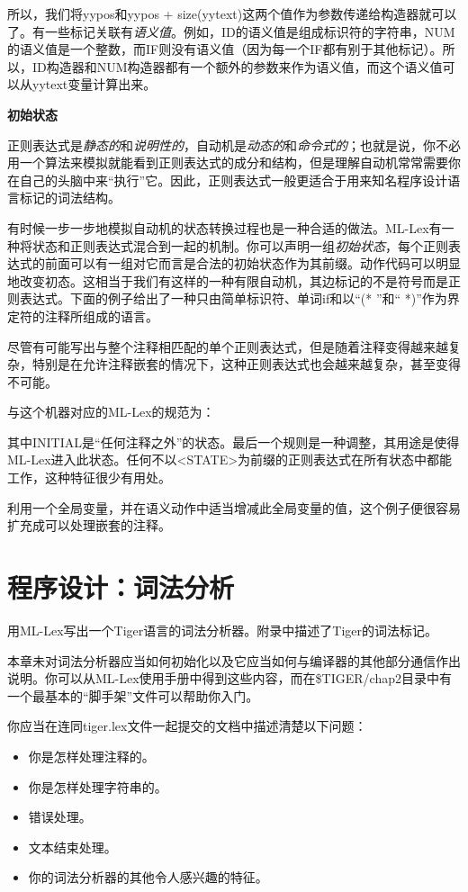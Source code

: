 \documentclass[cn,11pt,chinese]{elegantbook}
\begin{document}
所以，我们将yypos和yypos + size(yytext)这两个值作为参数传递给构造器就可以了。有一些标记关联有\textit{语义值}。例如，ID的语义值是组成标识符的字符串，NUM的语义值是一个整数，而IF则没有语义值（因为每一个IF都有别于其他标记）。所以，ID构造器和NUM构造器都有一个额外的参数来作为语义值，而这个语义值可以从yytext变量计算出来。

\textbf{初始状态}

正则表达式是\textit{静态的}和\textit{说明性的}，自动机是\textit{动态的}和\textit{命令式的}；也就是说，你不必用一个算法来模拟就能看到正则表达式的成分和结构，但是理解自动机常常需要你在自己的头脑中来“执行”它。因此，正则表达式一般更适合于用来知名程序设计语言标记的词法结构。

有时候一步一步地模拟自动机的状态转换过程也是一种合适的做法。ML-Lex有一种将状态和正则表达式混合到一起的机制。你可以声明一组\textit{初始状态}，每个正则表达式的前面可以有一组对它而言是合法的初始状态作为其前缀。动作代码可以明显地改变初态。这相当于我们有这样的一种有限自动机，其边标记的不是符号而是正则表达式。下面的例子给出了一种只由简单标识符、单词if和以“(* ”和“ *)”作为界定符的注释所组成的语言。

尽管有可能写出与整个注释相匹配的单个正则表达式，但是随着注释变得越来越复杂，特别是在允许注释嵌套的情况下，这种正则表达式也会越来越复杂，甚至变得不可能。

与这个机器对应的ML-Lex的规范为：

其中INITIAL是“任何注释之外”的状态。最后一个规则是一种调整，其用途是使得ML-Lex进入此状态。任何不以<STATE>为前缀的正则表达式在所有状态中都能工作，这种特征很少有用处。

利用一个全局变量，并在语义动作中适当增减此全局变量的值，这个例子便很容易扩充成可以处理嵌套的注释。

\section{程序设计：词法分析}

用ML-Lex写出一个Tiger语言的词法分析器。附录中描述了Tiger的词法标记。

本章未对词法分析器应当如何初始化以及它应当如何与编译器的其他部分通信作出说明。你可以从ML-Lex使用手册中得到这些内容，而在\$TIGER/chap2目录中有一个最基本的“脚手架”文件可以帮助你入门。

你应当在连同tiger.lex文件一起提交的文档中描述清楚以下问题：

\begin{itemize}
  \item 你是怎样处理注释的。
  \item 你是怎样处理字符串的。
  \item 错误处理。
  \item 文本结束处理。
  \item 你的词法分析器的其他令人感兴趣的特征。
\end{itemize}
\end{document}
